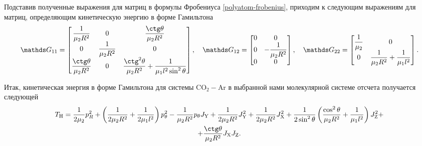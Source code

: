 Подставив полученные выражения для матриц в формулы Фробениуса \eqref{polyatom-frobenius}, приходим к следующим выражениям для матриц, определяющим кинетическую энергию в форме Гамильтона 
\begin{gather}
	\bbG_{11} =
	\begin{bmatrix}
		\dfrac{1}{\mu_2 R^2} & 0 & \dfrac{\ctg \theta}{\mu_2 R^2} \\
		0 & \dfrac{1}{\mu_2 R^2} & 0 \\
		\dfrac{\ctg \theta}{\mu_2 R^2} & 0 & \dfrac{\ctg^2 \theta}{\mu_2 R^2} + \dfrac{1}{\mu_1 l^2 \sin^2 \theta}
	\end{bmatrix}, \quad
	\bbG_{12} =
	\begin{bmatrix}
		0 & 0 \\
		0 & - \dfrac{1}{\mu_2 R^2} \\
		0 & 0
	\end{bmatrix}, \quad 
	\bbG_{22} = 
	\begin{bmatrix}
		\dfrac{1}{\mu_2} & 0 \\
		0 & \dfrac{1}{\mu_2 R^2} + \dfrac{1}{\mu_1 l^2}
	\end{bmatrix}. \notag
\end{gather}

Итак, кинетическая энергия в форме Гамильтона для системы CO$_2-$Ar в выбранной нами молекулярной системе отсчета получается следующей
\begin{gather}
\Th = \frac{1}{2 \mu_2} p_R^2 + \lb \frac{1}{2 \mu_2 R^2} + \frac{1}{2 \mu_1 l^2} \rb p_\theta^2 - \frac{1}{\mu_2 R^2} p_\theta \Jy + \frac{1}{2 \mu_2 R^2} \Jy^2 + \frac{1}{2 \mu_2 R^2} \Jx^2 + \frac{1}{2 \sin^2 \theta} \lb \frac{\cos^2 \theta}{\mu_2 R^2} + \frac{1}{\mu_1 l^2} \rb \Jz^2 + \notag \\
+ \frac{\ctg \theta}{\mu_2 R^2} \Jx \Jz. 
\end{gather}



